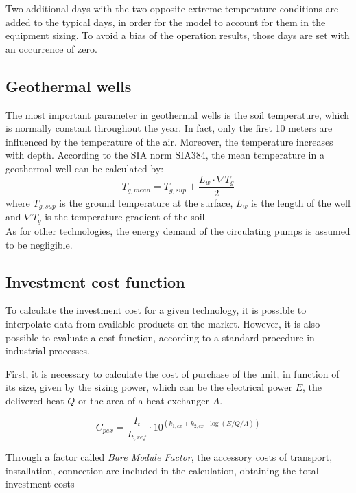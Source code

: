 \documentclass{article}
\begin{document}
Two additional days with the two opposite extreme temperature conditions are added to the typical days, in order for the model to account for them in the equipment sizing. To avoid a bias of the operation results, those days are set with an occurrence of zero.


\subsection{Geothermal wells}\label{ss:gtw}

The most important parameter in geothermal wells is the soil temperature, which is normally constant throughout the year. In fact, only the first 10 meters are influenced by the temperature of the air\cite{hanSensitivityAnalysisVertical2016}. Moreover, the temperature increases with depth. According to the SIA norm SIA384\cite{siaSIA384Sondes2010}, the mean temperature in a geothermal well can be calculated by:
\begin{equation}
T_{g, mean} = T_{g,sup} + \frac{L_{w} \cdot \nabla T_{g}}{2}
\end{equation}
where $T_{g,sup}$ is the ground temperature at the surface, $L_{w}$ is the length of the well and $ \nabla T_{g}$ is the temperature gradient of the soil.\\

As for other technologies, the energy demand of the circulating pumps is assumed to be negligible. 

\subsection{Investment cost function}\label{ss:ic}
To calculate the investment cost for a given technology, it is possible to interpolate data from available products on the market. However, it is also possible to evaluate a cost function, according to a standard procedure in industrial processes\cite{turtonrichardc.bailierichardwhitingwallace.AnalysisSynthesisDesign2003}.

First, it is necessary to calculate the cost of purchase of the unit, in function of its size, given by the sizing power, which can be the electrical power $E$, the delivered heat $Q$ or the area of a heat exchanger $A$.

\begin{equation}
C_{pex} = \frac{I_{t}}{I_{t,ref}} \cdot 10^ {(k_{1,ex} + k_{2,ex} \cdot \log(E/Q/A))}
\end{equation}

Through a factor called \emph{Bare Module Factor}, the accessory costs of transport, installation, connection are included in the calculation, obtaining the total investment costs
\end{document}
